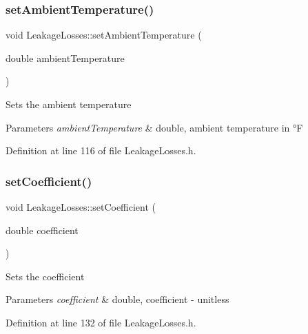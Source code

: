\subsubsection{\texorpdfstring{set\+Ambient\+Temperature()}{setAmbientTemperature()}}
{\footnotesize\ttfamily void Leakage\+Losses\+::set\+Ambient\+Temperature (\begin{DoxyParamCaption}\item[{double}]{ambient\+Temperature }\end{DoxyParamCaption})\hspace{0.3cm}{\ttfamily [inline]}}

Sets the ambient temperature 
\begin{DoxyParams}{Parameters}
{\em ambient\+Temperature} & double, ambient temperature in °F \\
\hline
\end{DoxyParams}


Definition at line 116 of file Leakage\+Losses.\+h.

\mbox{\label{class_leakage_losses_add2e96e75b6dd965370340dc03717434}} 
\subsubsection{\texorpdfstring{set\+Coefficient()}{setCoefficient()}}
{\footnotesize\ttfamily void Leakage\+Losses\+::set\+Coefficient (\begin{DoxyParamCaption}\item[{double}]{coefficient }\end{DoxyParamCaption})\hspace{0.3cm}{\ttfamily [inline]}}

Sets the coefficient 
\begin{DoxyParams}{Parameters}
{\em coefficient} & double, coefficient -\/ unitless \\
\hline
\end{DoxyParams}


Definition at line 132 of file Leakage\+Losses.\+h.

\mbox{\label{class_leakage_losses_a1af53750d5d9573dffa8674b3479e8d6}} 
